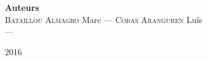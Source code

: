 \begin{titlepage}
\begin{center}
\vfill
{\large
\begin{center}
  {\Large  \hspace{0.5cm} \textbf{Auteurs} \hspace{0.5cm}   } \\[0.3cm]
	\textsc{Bataillou Almagro} Marc --- \textsc{Cobas Aranguren} Luís\\
	  ---
\end{center}
}
\vfill

{\large 2016}

\end{center}
\end{titlepage}